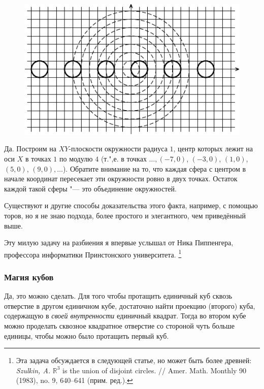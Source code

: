 \documentclass[twoside]{book}
\begin{document}
\begin{figure}[b]
  \vspace{-\jot}
\centering
\includegraphics {mp/wink-10}
\end{figure} 

Да.
Построим на $XY$-плоскости окружности радиуса $1$, центр которых лежит на оси $X$ в точках $1$ по модулю $4$ (т.",е. в точках $\dots, (-7,0)$, $(-3,0)$, $(1,0)$, $(5,0)$, $(9,0),\dots$).
Обратите внимание на то, что каждая сфера с центром в начале координат пересекает эти окружности ровно в двух точках.
Остаток каждой такой сферы "--- это объединение окружностей.
\heart


Существуют и другие способы доказательства этого факта, например, с помощью торов, но я не знаю подхода, более простого и элегантного, чем приведённый выше.

Эту милую задачу на разбиения я впервые услышал от Ника Пиппенгера, %
профессора информатики Принстонского университета.
\footnote{Эта задача обсуждается в следующей статье, но может быть более древней: 
\emph{Szulkin, A.} $\mathbb{R}^3$ is the union of disjoint circles. /\!/ Amer. Math. Monthly 90 (1983), no. 9, 640--641 (прим. ред.).}

\subsubsection*{Магия кубов}%

Да, это можно сделать.
Для того чтобы протащить единичный куб сквозь отверстие в другом единичном кубе, достаточно найти проекцию (второго) куба, содержащую в \emph{своей внутренности} единичный квадрат.
Тогда во втором кубе можно проделать сквозное квадратное отверстие %
со стороной чуть больше единицы, чтобы можно было протащить первый куб.
\end{document}

